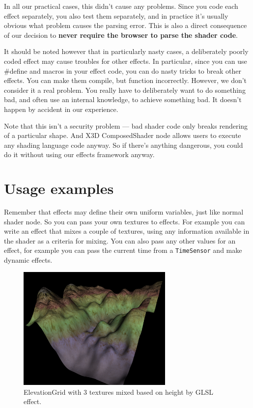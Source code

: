 \documentclass{acmsiggraph}                     %
\begin{document}
In all our practical cases, this didn't cause any problems.
Since you code each effect separately, you also test them separately,
and in practice it's usually obvious what problem causes the parsing error.
This is also a direct consequence of our decision to \textbf{never require
the browser to parse the shader code}.

It should be noted however that in particularly nasty cases,
a deliberately poorly coded effect may cause troubles for other effects.
In particular, since you can use \#define and macros in your effect code,
you can do nasty tricks to break other effects. You can make them compile,
but function incorrectly. However, we don't consider
it a real problem. You really have to deliberately want to do something bad,
and often use an internal knowledge, to achieve something bad.
It doesn't happen by accident in our experience.

Note that this isn't a security problem --- bad shader code only breaks
rendering of a particular shape. And X3D ComposedShader node allows users
to execute any shading language code anyway. So if there's anything dangerous,
you could do it without using our effects framework anyway.

\section{Usage examples}

Remember that effects may define their own uniform variables,
just like normal shader node. So you can pass your own textures
to effects. For example you can write an effect that mixes a couple of textures,
using any information available in the shader as a criteria for mixing.
You can also pass any other values for an effect, for example you can
pass the current time from a \texttt{TimeSensor} and make dynamic effects.

\begin{figure}[H]
  \centering
  \includegraphics[width=3in]{terrain}
  \caption{ElevationGrid with 3 textures mixed based on height by GLSL effect.}
\end{figure}
\end{document}
